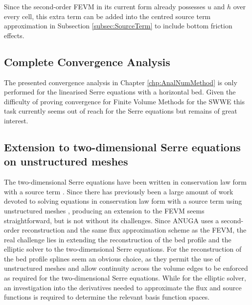 Since the second-order FEVM in its current form already possesses $u$ and $h$ over every cell, this extra term can be added into the centred source term approximation in Subsection \ref{subsec:SourceTerm} to include bottom friction effects. 

\subsection{Complete Convergence Analysis}
The presented convergence analysis in Chapter \ref{chp:AnalNumMethod} is only performed for the linearised Serre equations with a horizontal bed. Given the difficulty of proving convergence for Finite Volume Methods for the SWWE \cite{LeVeque-2002} this task currently seems out of reach for the Serre equations but remains of great interest.

\subsection{Extension to two-dimensional Serre equations on unstructured meshes}
The two-dimensional Serre equations have been written in conservation law form with a source term \cite{Zoppou-2014}. Since there has previously been a large amount of work devoted to solving equations in conservation law form with a source term using unstructured meshes \cite{ANUGA,ClawPack}, producing an extension to the FEVM seems straightforward, but is not without its challenges. Since ANUGA \cite{ANUGA} uses a second-order reconstruction and the same flux approximation scheme as the FEVM, the real challenge lies in extending the reconstruction of the bed profile and the elliptic solver to the two-dimensional Serre equations. For the reconstruction of the bed profile splines seem an obvious choice, as they permit the use of unstructured meshes and allow continuity across the volume edges to be enforced as required for the two-dimensional Serre equations. While for the elliptic solver, an investigation into the derivatives needed to approximate the flux and source functions is required to determine the relevant basis function spaces. 




